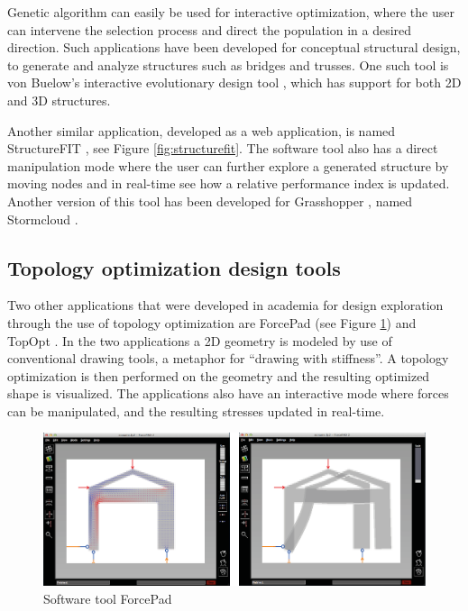 Genetic algorithm can easily be used for interactive optimization, where the user can intervene the selection process and direct the population in a desired direction. Such applications have been developed for conceptual structural design, to generate and analyze structures such as bridges and trusses. One such tool is von Buelow’s interactive evolutionary design tool \cite{VonBuelow2008}, which has support for both 2D and 3D structures.

Another similar application, developed as a web application, is named StructureFIT \cite{Mueller2013}\cite{Mueller2015}, see Figure \ref{fig:structurefit}. The software tool also has a direct manipulation mode where the user can further explore a generated structure by moving nodes and in real-time see how a relative performance index is updated. Another version of this tool has been developed for Grasshopper \cite{Grasshopper}, named Stormcloud \cite{Danhaive2015}.

\subsection{Topology optimization design tools}
Two other applications that were developed in academia for design exploration through the use of topology optimization are ForcePad (see Figure \ref{fig:forcepad}) \cite{Lindemann2004} and TopOpt \cite{Aage2013}. In the two applications a 2D geometry is modeled by use of conventional drawing tools, a metaphor for “drawing with stiffness”. A topology optimization is then performed on the geometry and the resulting optimized shape is visualized. The applications also have an interactive mode where forces can be manipulated, and the resulting stresses updated in real-time.

\begin{figure}
  \includegraphics[width=350pt]{graphics/forcepad.png}
  \caption{Software tool ForcePad}
  \label{fig:forcepad}
\end{figure}



